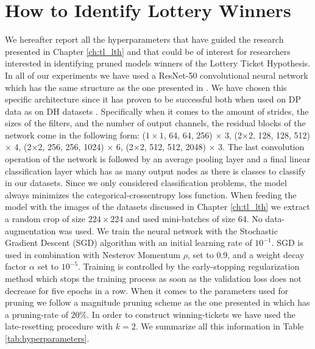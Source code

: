 
\label{ch:appendix}

\chapter{How to Identify Lottery Winners}\label{ch:appendixlottery}

We hereafter report all the hyperparameters that have guided the research presented in Chapter \ref{ch:tl_lth} and that could be of interest for researchers interested in identifying pruned models winners of the Lottery Ticket Hypothesis.
In all of our experiments we have used a ResNet-50 convolutional neural network which has the same structure as the one presented in \cite{han2015deep}.
We have chosen this specific architecture since it has proven to be successful both when used on DP data \cite{mormont2018comparison} as on DH datasets \cite{sabatelli2018deep}. Specifically when it comes to the amount of strides, the sizes of the filters, and the number of output channels, the residual blocks of the network come in the following form:  ($1\times1$, 64, 64, 256) $\times$ 3, (2$\times$2, 128, 128, 512) $\times$ 4, (2$\times$2, 256, 256, 1024) $\times$ 6, (2$\times$2, 512, 512, 2048) $\times$ 3. The last convolution operation of the network is followed by an average pooling layer and a final linear classification layer which has as many output nodes as there is classes to classify in our datasets. Since we only considered classification problems, the model always minimizes the categorical-crossentropy loss function. When feeding the model with the images of the datasets discussed in Chapter \ref{ch:tl_lth} we extract a random crop of size $224\times224$ and used mini-batches of size 64. No data-augmentation was used. We train the neural network with the Stochastic Gradient Descent (SGD) algorithm with an initial learning rate of $10^{-1}$. SGD is used in combination with Nesterov Momentum $\rho$, set to 0.9, and a weight decay factor $\alpha$ set to $10^{-5}$. Training is controlled by the early-stopping regularization method which stops the training process as soon as the validation loss does not decrease for five epochs in a row. When it comes to the parameters used for pruning we follow a magnitude pruning scheme as the one presented in \cite{han2015learning} which has a pruning-rate of $20\%$. In order to construct winning-tickets we have used the late-resetting procedure with $k=2$. We summarize all this information in Table \ref{tab:hyperparameters}. 

